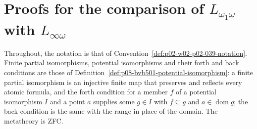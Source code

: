 \section{Proofs for the comparison of \(L_{\omega_1\omega}\) with \(L_{\infty\omega}\)}
\label{sec:annex-p02-w02-p02-039-lomega-treatments}

Throughout, the notation is that of
Convention~\ref{def:p02-w02-p02-039-notation}.  Finite partial isomorphisms,
potential isomorphisms and their forth and back conditions are those of
Definition~\ref{def:p08-bvb501-potential-isomorphism}: a finite partial
isomorphism is an injective finite map that preserves and reflects every
atomic formula, and the forth condition for a member \(f\) of a potential
isomorphism \(I\) and a point \(a\) supplies some \(g\in I\) with
\(f\subseteq g\) and \(a\in\operatorname{dom}g\); the back condition is the
same with the range in place of the domain.  The metatheory is ZFC.

